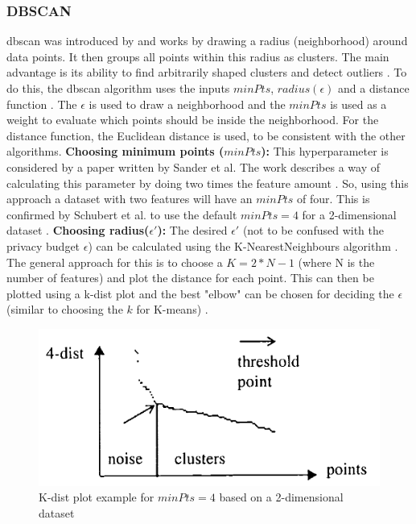 \subsubsection{DBSCAN} \label{theory:clustering-dbscan}
\gls{dbscan} was introduced by \citep{ester_density-based_nodate} and works by drawing a radius (neighborhood) around data points.
It then groups all points within this radius as clusters. The main advantage is its ability to find arbitrarily shaped clusters and detect outliers \citep{liu_privacy_2012}.
To do this, the \gls{dbscan} algorithm uses the inputs $minPts$, $radius(\epsilon)$ and a distance function \citep{schubert_dbscan_2017}.
The $\epsilon$ is used to draw a neighborhood and the $minPts$ is used as a weight to evaluate which points should be inside the neighborhood.
For the distance function, the Euclidean distance is used, to be consistent with the other algorithms. \newline
\textbf{Choosing minimum points ($minPts$):} This hyperparameter is considered by a paper written by Sander et al.
The work describes a way of calculating this parameter by doing two times the feature amount \citep{sander_density-based_1998}.
So, using this approach a dataset with two features will have an $minPts$ of four.
This is confirmed by Schubert et al. to use the default $minPts = 4$ for a 2-dimensional dataset \citep{schubert_dbscan_2017}. \newpage
\textbf{Choosing radius($\epsilon'$):} The desired $\epsilon'$ (not to be confused with the privacy budget $\epsilon$) can be calculated using the K-NearestNeighbours algorithm \citep{ester_density-based_nodate,schubert_dbscan_2017}.
The general approach for this is to choose a $K = 2*N - 1$ (where N is the number of features) and plot the distance for each point.
This can then be plotted using a k-dist plot and the best "elbow" can be chosen for deciding the $\epsilon$ (similar to choosing the $k$ for K-means) \citep{elbatta_dynamic_2013}.
\begin{figure}[H]
  \includegraphics{TheorethicalFramework/K-dist-elbow.png}
  \caption{K-dist plot example for $minPts = 4$ based on a 2-dimensional dataset \citep{ester_density-based_nodate}}
  \label{k-dist-plot}
\end{figure}

